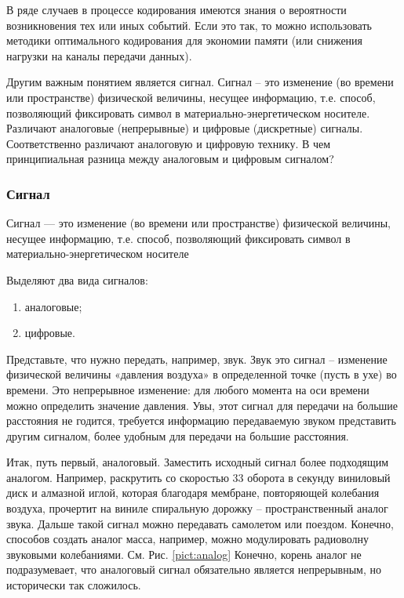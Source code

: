 В ряде случаев в процессе кодирования имеются знания о вероятности возникновения тех или иных событий. Если это так, то можно использовать методики оптимального кодирования для экономии памяти (или снижения нагрузки на каналы передачи данных).

Другим важным понятием является сигнал. Сигнал – это изменение (во времени или пространстве) физической величины, несущее информацию, т.е. способ, позволяющий фиксировать символ в материально-энергетическом носителе. Различают аналоговые (непрерывные) и цифровые (дискретные) сигналы. Соответственно различают аналоговую и цифровую технику. В чем принципиальная разница между аналоговым и цифровым сигналом?

\begin{frame}
    \frametitle{Сигнал}
    
    \begin{definition}
        \alert{Сигнал} --- это изменение (во времени или пространстве) физической величины, несущее информацию, т.е. способ, позволяющий фиксировать \alert{символ} в материально-энергетическом носителе
    \end{definition}
    
    Выделяют два вида сигналов:
    \begin{enumerate}
        \item аналоговые;
        \item цифровые.
    \end{enumerate}
\end{frame}


Представьте, что нужно передать, например, звук. Звук это сигнал – изменение физической величины «давления воздуха» в определенной точке (пусть в ухе) во времени. Это непрерывное изменение: для любого момента на оси времени можно определить значение давления. Увы, этот сигнал для передачи на большие расстояния не годится, требуется информацию передаваемую звуком представить другим сигналом, более удобным для передачи на большие расстояния.

Итак, путь первый, аналоговый. Заместить исходный сигнал более подходящим аналогом. Например, раскрутить со скоростью 33 оборота в секунду виниловый диск и алмазной иглой, которая благодаря мембране, повторяющей колебания воздуха, прочертит на виниле спиральную дорожку – пространственный аналог звука. Дальше такой сигнал можно передавать самолетом или поездом. Конечно, способов создать аналог масса, например, можно модулировать радиоволну звуковыми колебаниями. См. Рис. \ref{pict:analog}  Конечно, корень аналог не подразумевает, что аналоговый сигнал обязательно является непрерывным, но исторически так сложилось.

